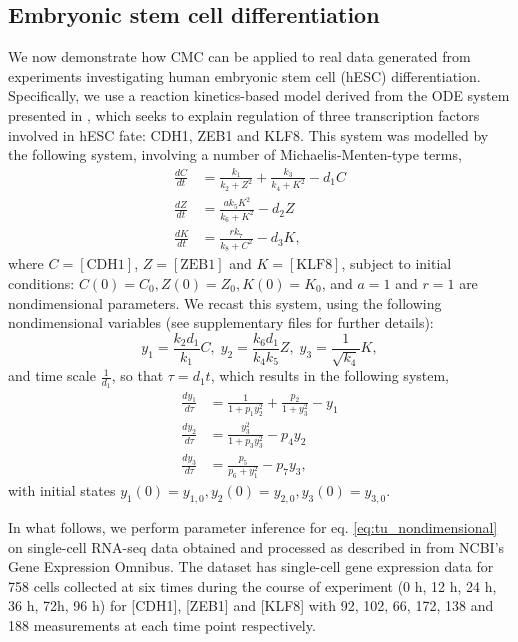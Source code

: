 \subsection{Embryonic stem cell differentiation}\label{sec:hesc}
We now demonstrate how CMC can be applied to real data generated from experiments investigating human embryonic stem cell (hESC) differentiation. Specifically, we use a reaction kinetics-based model derived from the ODE system presented in \cite{tu2019single}, which seeks to explain regulation of three transcription factors involved in hESC fate: CDH1, ZEB1 and KLF8. This system was modelled by the following system, involving a number of Michaelis-Menten-type terms,
%
\begin{equation}
\begin{aligned}
\frac{d C}{d t} &= \frac{k_1}{k_2 + Z^2} + \frac{k_3}{k_4 + K^2} - d_1 C\\
\frac{d Z}{d t} &= \frac{a k_5 K^2}{k_6 + K^2} - d_2 Z\\
\frac{d K}{d t} &= \frac{r k_7}{k_8 + C^2} - d_3 K,
\end{aligned}
\end{equation}
%
where $C=[\text{CDH1}]$, $Z=[\text{ZEB1}]$ and $K=[\text{KLF8}]$, subject to initial conditions: $C(0) = C_0, Z(0)=Z_0, K(0) = K_0$, and $a=1$ and $r=1$ are nondimensional parameters. We recast this system, using the following nondimensional variables (see supplementary files for further details):
%
\begin{equation}
y_1 = \frac{k_2 d_1}{k_1} C, \; y_2 = \frac{k_6 d_1}{k_4 k_5} Z, \; y_3 = \frac{1}{\sqrt{k_4}} K,
\end{equation}
%
and time scale $\frac{1}{d_1}$, so that $\tau = d_1 t$, which results in the following system,
%
\begin{equation}\label{eq:tu_nondimensional}
\begin{aligned}
\frac{d y_1}{ d\tau} &= \frac{1}{1 + p_1 y_2^2} + \frac{p_2}{1 + y_3^2} - y_1\\
\frac{d y_2}{ d\tau} &= \frac{y_3^2}{1 + p_3 y_3^2} - p_4 y_2\\
\frac{d y_3}{d\tau} &= \frac{p_5}{p_6 + y_1^2} - p_7 y_3,
\end{aligned}
\end{equation}
%
with initial states $y_1(0) = y_{1,0}, y_2(0) = y_{2,0}, y_3(0) = y_{3,0}$.

In what follows, we perform parameter inference for eq. \eqref{eq:tu_nondimensional} on single-cell RNA-seq data obtained and processed as described in \cite{tu2019single} from NCBI's Gene Expression Omnibus. The dataset has single-cell gene expression data for 758 cells collected at six times during the course of experiment (0 h, 12 h, 24 h, 36 h, 72h, 96 h) for [CDH1], [ZEB1] and [KLF8] with 92, 102, 66, 172, 138 and 188 measurements at each time point respectively.


